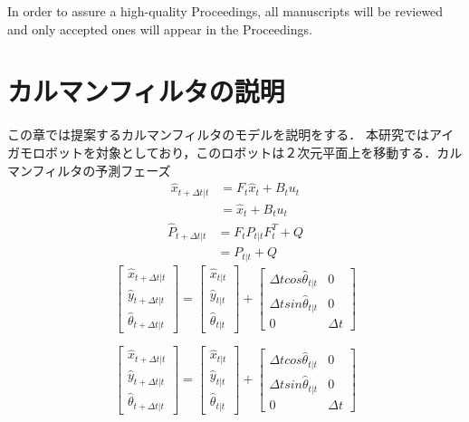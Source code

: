 \documentclass[a4paper]{article}
\begin{document}
In order to assure a high-quality Proceedings, all manuscripts will be reviewed and
only accepted ones will appear in the Proceedings.


\section{カルマンフィルタの説明}
この章では提案するカルマンフィルタのモデルを説明をする．
本研究ではアイガモロボットを対象としており，このロボットは２次元平面上を移動する．カルマンフィルタの予測フェーズ
\begin{align}
     \hat{x}_{t+ \Delta t|t} &= F_{t} \hat{x}_{t} + B_{t} u_{t} \nonumber \\
                             &= \hat{x}_{t} + B_{t} u_{t}
     \label{eq:1}
\end{align}
%
\begin{align}
         \hat{P}_{t+ \Delta t|t} &= F_{t} P_{t|t} F_{t}^{T} + Q \nonumber \\
                                 &= P_{t|t} + Q
     \label{eq:2}
\end{align}
%
%
\begin{equation}
    \begin{bmatrix}
    \hat{x}_{t+ \Delta t|t} \\
    \hat{y}_{t+ \Delta t|t} \\
    \hat{\theta}_{t+ \Delta t|t}
    \end{bmatrix} 
    =
    \begin{bmatrix}
        \hat{x}_{t|t} \\
        \hat{y}_{t|t} \\
        \hat{\theta}_{t|t}
    \end{bmatrix} 
    +
    \begin{bmatrix}
        \Delta t cos\hat{\theta}_{t|t} &0 \\
        \Delta t sin\hat{\theta}_{t|t} &0 \\
        0                              &{\Delta}t
    \end{bmatrix}
    \label{eq:3} 
\end{equation}
%
%

\begin{equation}
    \begin{bmatrix}
    \hat{x}_{t+ \Delta t|t} \\
    \hat{y}_{t+ \Delta t|t} \\
    \hat{\theta}_{t+ \Delta t|t}
    \end{bmatrix} 
    =
    \begin{bmatrix}
        \hat{x}_{t|t} \\
        \hat{y}_{t|t} \\
        \hat{\theta}_{t|t}
    \end{bmatrix} 
    +
    \begin{bmatrix}
        \Delta t cos\hat{\theta}_{t|t} &0 \\
        \Delta t sin\hat{\theta}_{t|t} &0 \\
        0                              &{\Delta}t
    \end{bmatrix}
    \label{eq:3} 
\end{equation}
\end{document}
